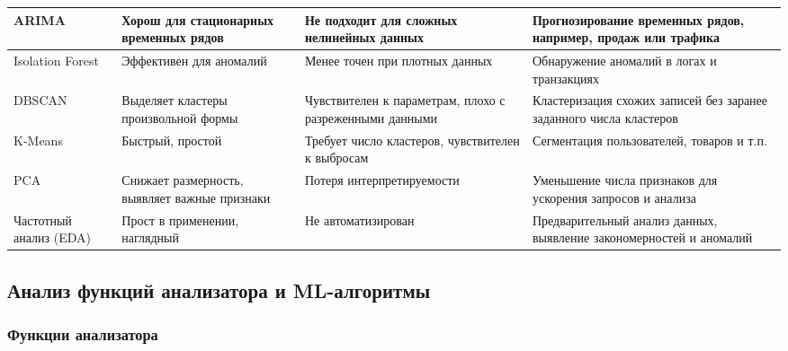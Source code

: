 \documentclass[14pt]{extarticle}
\begin{document}
\begin{longtable}{|p{3.5cm}|p{3.5cm}|p{3.5cm}|p{4.5cm}|}
\hline
ARIMA & Хорош для стационарных временных рядов & Не подходит для сложных нелинейных данных & Прогнозирование временных рядов, например, продаж или трафика \\
\hline
Isolation Forest & Эффективен для аномалий & Менее точен при плотных данных & Обнаружение аномалий в логах и транзакциях \\
\hline
DBSCAN & Выделяет кластеры произвольной формы & Чувствителен к параметрам, плохо с разреженными данными & Кластеризация схожих записей без заранее заданного числа кластеров \\
\hline
K-Means & Быстрый, простой & Требует число кластеров, чувствителен к выбросам & Сегментация пользователей, товаров и т.п. \\
\hline
PCA & Снижает размерность, выявляет важные признаки & Потеря интерпретируемости & Уменьшение числа признаков для ускорения запросов и анализа \\
\hline
Частотный анализ (EDA) & Прост в применении, наглядный & Не автоматизирован & Предварительный анализ данных, выявление закономерностей и аномалий \\
\hline

\end{longtable}

\subsection{Анализ функций анализатора и ML-алгоритмы}

\subsubsection{Функции анализатора}
\end{document}
